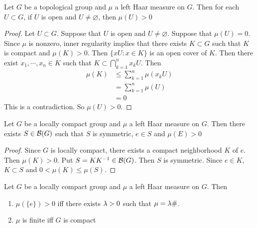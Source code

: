 \documentclass{book}
\begin{document}
	\begin{ex}  
		Let $G$ be a topological group and $\mu$ a left Haar measure on $G$. Then for each $U \subset G$, if $U$ is open and $U \neq \varnothing$, then $\mu(U) > 0$
	\end{ex}

	\begin{proof}
		Let $U \subset G$. Suppose that $U$ is open and $U \neq \varnothing$. Suppose that  $\mu(U) = 0$. Since $\mu$ is nonzero, inner regularity implies that there exists $K \subset G$ such that $K$ is compact and $\mu(K) > 0$. Then $ \{xU: x \in K\}$ is an open cover of $K$. Then there exist $x_1, \cdots, x_n \in K$ such that $K \subset \bigcap\limits_{k=1}^n x_kU$. Then 
		\begin{align}
			\mu(K) 
			& \leq \sum_{k =1}^n \mu(x_kU) \\
			& = \sum_{k =1}^n \mu(U) \\
			& = 0
		\end{align} 
		This is a contradiction. So $\mu(U) > 0$.
	\end{proof}

	\begin{ex}  
		Let $G$ be a locally compact group and $\mu$ a left Haar measure on $G$. Then there exists $S \in \mathcal{B}(G)$ such that $S$ is symmetric, $e \in S$ and $\mu(E) > 0$ 
	\end{ex}

	\begin{proof}
		Since $G$ is locally compact, there exists a compact neighborhood $K$ of $e$. Then $\mu(K) > 0$. Put $S = KK^{-1} \in \mathcal{B}(G)$. Then $S$ is symmetric. Since $e \in K$, $K \subset S$ and $0 < \mu(K) \leq \mu(S)$.
	\end{proof}
	
	\begin{ex}  
		Let $G$ be a locally compact group and $\mu$ a left Haar measure on $G$. Then 
		\begin{enumerate}
			\item  $\mu(\{e\}) > 0$ iff there exists $\lambda >0$ such that $\mu = \lambda \#$.
			\item $\mu$ is finite iff $G$ is compact
		\end{enumerate}
	\end{ex}
\end{document}
